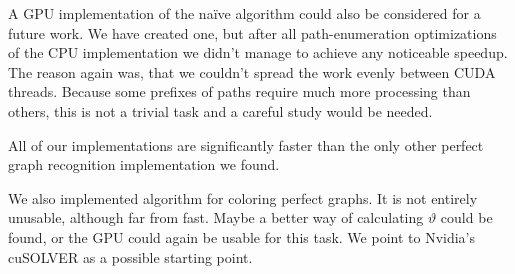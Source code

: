 A GPU implementation of the na\"ive algorithm could also be considered for a future work. We have created one, but after all path-enumeration optimizations of the CPU implementation we didn't manage to achieve any noticeable speedup. The reason again was, that we couldn't spread the work evenly between CUDA threads. Because some prefixes of paths require much more processing than others, this is not a trivial task and a careful study would be needed.

All of our implementations are significantly faster than the only other perfect graph recognition implementation we found.

We also implemented algorithm for coloring perfect graphs. It is not entirely unusable, although far from fast. Maybe a better way of calculating $\vartheta$ could be found, or the GPU could again be usable for this task. We point to Nvidia's cuSOLVER  \cite{cusolver} as a possible starting point.